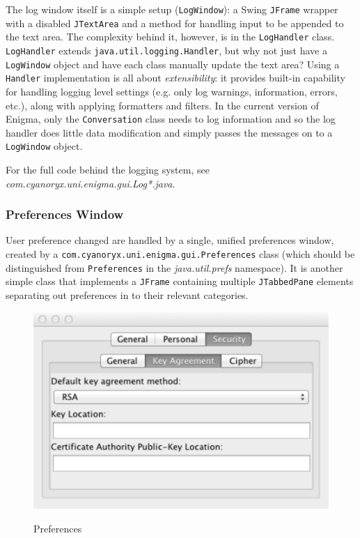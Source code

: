     The log window itself is a simple setup (\verb!LogWindow!): a Swing \verb!JFrame! wrapper with a disabled \verb!JTextArea! and a method for handling input to be appended to the text area. The complexity behind it, however, is in the \verb!LogHandler! class. \verb!LogHandler! extends \verb!java.util.logging.Handler!, but why not just have a \verb!LogWindow! object and have each class manually update the text area? Using a \verb!Handler! implementation is all about \emph{extensibility}: it provides built-in capability for handling logging level settings (e.g. only log warnings, information, errors, etc.), along with applying formatters and filters. In the current version of Enigma, only the \verb!Conversation! class needs to log information and so the log handler does little data modification and simply passes the messages on to a \verb!LogWindow! object.
    
    For the full code behind the logging system, see \emph{com.cyanoryx.uni.enigma.gui.Log*.java}.
    
    \subsubsection{Preferences Window}
    
    User preference changed are handled by a single, unified preferences window, created by a \verb!com.cyanoryx.uni.enigma.gui.Preferences! class (which should be distinguished from \verb!Preferences! in the \emph{java.util.prefs} namespace). It is another simple class that implements a \verb!JFrame! containing multiple \verb!JTabbedPane! elements separating out preferences in to their relevant categories. 
    
     \begin{figure}
      \centering
      \includegraphics[scale=0.7]{./Figures/Ch6/6-3-1-2-preferences_window.pdf}
      \label{fig:pref_window}
      \caption{Preferences}
     \end{figure}
    
